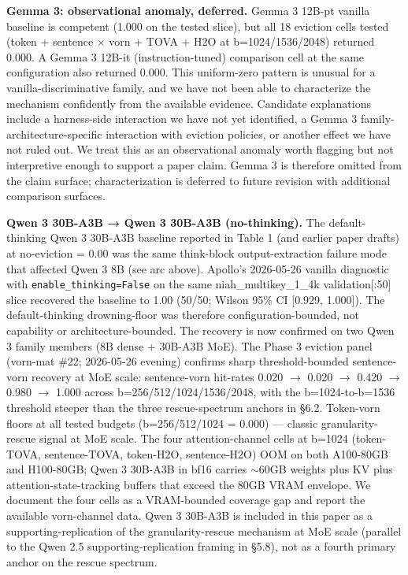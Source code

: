 \documentclass[
]{article}
\begin{document}
\textbf{Gemma 3: observational anomaly, deferred.} Gemma 3 12B-pt
vanilla baseline is competent (1.000 on the tested slice), but all
18 eviction cells tested (token + sentence $\times$ vorn + TOVA + H2O
at b=1024/1536/2048) returned 0.000. A Gemma 3 12B-it
(instruction-tuned) comparison cell at the same configuration also
returned 0.000. This uniform-zero pattern is unusual for a
vanilla-discriminative family, and we have not been able to
characterize the mechanism confidently from the available evidence.
Candidate explanations include a harness-side interaction we have not
yet identified, a Gemma 3 family-architecture-specific interaction
with eviction policies, or another effect we have not ruled out. We
treat this as an observational anomaly worth flagging but not
interpretive enough to support a paper claim. Gemma 3 is therefore
omitted from the claim surface; characterization is deferred to
future revision with additional comparison surfaces.

\textbf{Qwen 3 30B-A3B → Qwen 3 30B-A3B (no-thinking).} The
default-thinking Qwen 3 30B-A3B baseline reported in Table 1 (and
earlier paper drafts) at no-eviction = 0.00 was the same think-block
output-extraction failure mode that affected Qwen 3 8B (see arc above).
Apollo's 2026-05-26 vanilla diagnostic with \texttt{enable\_thinking=False}
on the same niah\_multikey\_1\_4k validation[:50] slice recovered the
baseline to 1.00 (50/50; Wilson 95\% CI [0.929, 1.000]). The
default-thinking drowning-floor was therefore configuration-bounded, not
capability or architecture-bounded. The recovery is now confirmed on
two Qwen 3 family members (8B dense + 30B-A3B MoE). The Phase 3
eviction panel (vorn-mat \#22; 2026-05-26 evening) confirms sharp
threshold-bounded sentence-vorn recovery at MoE scale: sentence-vorn
hit-rates 0.020 $\rightarrow$ 0.020 $\rightarrow$ 0.420 $\rightarrow$
0.980 $\rightarrow$ 1.000 across b=256/512/1024/1536/2048, with the
b=1024-to-b=1536 threshold steeper than the three rescue-spectrum
anchors in §6.2. Token-vorn floors at all tested budgets
(b=256/512/1024 = 0.000) --- classic granularity-rescue signal at MoE
scale. The four attention-channel cells at b=1024 (token-TOVA,
sentence-TOVA, token-H2O, sentence-H2O) OOM on both A100-80GB and
H100-80GB; Qwen 3 30B-A3B in bf16 carries $\sim$60GB weights plus KV
plus attention-state-tracking buffers that exceed the 80GB VRAM
envelope. We document the four cells as a VRAM-bounded coverage gap
and report the available vorn-channel data. Qwen 3 30B-A3B is included
in this paper as a supporting-replication of the granularity-rescue
mechanism at MoE scale (parallel to the Qwen 2.5 supporting-replication
framing in §5.8), not as a fourth primary anchor on the rescue
spectrum.
\end{document}
